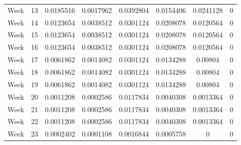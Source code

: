 \begin{center}
\begin{longtable}{cccccccc}
    Week & 13 & 0.0185516 & 0.0017962 & 0.0392804 & 0.0154406 & 0.0241128 & 0 \\  
    Week & 14 & 0.0123654 & 0.0038512 & 0.0301124 & 0.0208078 & 0.0120564 & 0 \\  
    Week & 15 & 0.0123654 & 0.0038512 & 0.0301124 & 0.0208078 & 0.0120564 & 0 \\  
    Week & 16 & 0.0123654 & 0.0038512 & 0.0301124 & 0.0208078 & 0.0120564 & 0 \\  
    Week & 17 & 0.0061862 & 0.0014082 & 0.0301124 & 0.0134288 & 0.00804 & 0 \\  
    Week & 18 & 0.0061862 & 0.0014082 & 0.0301124 & 0.0134288 & 0.00804 & 0 \\  
    Week & 19 & 0.0061862 & 0.0014082 & 0.0301124 & 0.0134288 & 0.00804 & 0 \\  
    Week & 20 & 0.0011208 & 0.0002586 & 0.0117834 & 0.0040308 & 0.0013364 & 0 \\  
    Week & 21 & 0.0011208 & 0.0002586 & 0.0117834 & 0.0040308 & 0.0013364 & 0 \\  
    Week & 22 & 0.0011208 & 0.0002586 & 0.0117834 & 0.0040308 & 0.0013364 & 0 \\  
    Week & 23 & 0.0002402 & 0.0001108 & 0.0016844 & 0.0005758 & 0 & 0 \\  
    \hline
    \end{longtable}
 \label{tab:deptripnt}
\end{center}